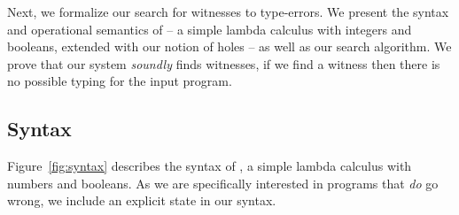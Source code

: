 %
%
%
%
Next, we formalize our search for witnesses to type-errors.
%
We present the syntax and operational semantics of \lang -- a simple
lambda calculus with integers and booleans, extended with our notion of
holes -- as well as our search algorithm.
%
We prove that our system \emph{soundly} finds witnesses, \ie if we find
a witness then there is no possible typing for the input program.
%
\subsection{Syntax}
\label{sec:syntax}

%
Figure~\ref{fig:syntax} describes the syntax of \lang, a simple lambda
calculus with numbers and booleans.
%
As we are specifically interested in
programs that \emph{do} go wrong, we include an explicit \stuck state in
our syntax.
%
